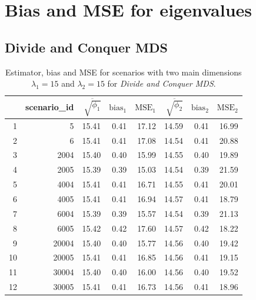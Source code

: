 \documentclass[11pt]{report}
\begin{document}
\chapter{Bias and MSE for eigenvalues}
\section{Divide and Conquer MDS}
\label{chap:mes}

\begin{table}[ht]
\centering
\begin{tabular}{rrrrrrrr}
 & scenario\_id & $\overline{\sqrt{\phi_1}}$ & $\mbox{bias}_1$ & $\mbox{MSE}_1$ & $\overline{\sqrt{\phi_2}}$ & $\mbox{bias}_2$ & $\mbox{MSE}_2$ \\ 
  \hline
  1 & 5 & 15.41 & 0.41 & 17.12 & 14.59 & 0.41 & 16.99 \\ 
  2 & 6 & 15.41 & 0.41 & 17.08 & 14.54 & 0.41 & 20.88 \\ 
  3 & 2004 & 15.40 & 0.40 & 15.99 & 14.55 & 0.40 & 19.89 \\ 
  4 & 2005 & 15.39 & 0.39 & 15.03 & 14.54 & 0.39 & 21.59 \\ 
  5 & 4004 & 15.41 & 0.41 & 16.71 & 14.55 & 0.41 & 20.01 \\ 
  6 & 4005 & 15.41 & 0.41 & 16.94 & 14.57 & 0.41 & 18.79 \\ 
  7 & 6004 & 15.39 & 0.39 & 15.57 & 14.54 & 0.39 & 21.13 \\ 
  8 & 6005 & 15.42 & 0.42 & 17.60 & 14.57 & 0.42 & 18.22 \\ 
  9 & 20004 & 15.40 & 0.40 & 15.77 & 14.56 & 0.40 & 19.42 \\ 
  10 & 20005 & 15.41 & 0.41 & 16.85 & 14.56 & 0.41 & 19.15 \\ 
  11 & 30004 & 15.40 & 0.40 & 16.00 & 14.56 & 0.40 & 19.52 \\ 
  12 & 30005 & 15.41 & 0.41 & 16.73 & 14.56 & 0.41 & 18.96 \\ 
   \hline
\end{tabular}
\caption{Estimator, bias and MSE for scenarios with two main dimensions $\lambda_1 = 15$ and $\lambda_2 = 15$ for \textit{Divide and Conquer MDS}.}
\end{table}
\end{document}
